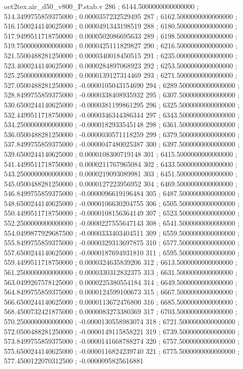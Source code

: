 \begin{filecontents}[overwrite]{oct2tex.air_d50_v800_P.stab.v}
286 ; 6144.5000000000000000 ; 514.3499755859375000 ; 0.0000357232529495
287 ; 6162.5000000000000000 ; 516.1500244140625000 ; 0.0000491343198519
288 ; 6180.5000000000000000 ; 517.9499511718750000 ; 0.0000502086695633
289 ; 6198.5000000000000000 ; 519.7500000000000000 ; 0.0000425111829827
290 ; 6216.5000000000000000 ; 521.5500488281250000 ; 0.0000340018450515
291 ; 6235.0000000000000000 ; 523.4000244140625000 ; 0.0000284897068923
292 ; 6253.5000000000000000 ; 525.2500000000000000 ; 0.0000139127314469
293 ; 6271.5000000000000000 ; 527.0500488281250000 ; -0.0000105043154690
294 ; 6289.5000000000000000 ; 528.8499755859375000 ; -0.0000338408935932
295 ; 6307.5000000000000000 ; 530.6500244140625000 ; -0.0000381199861295
296 ; 6325.5000000000000000 ; 532.4499511718750000 ; -0.0000346344386344
297 ; 6343.5000000000000000 ; 534.2500000000000000 ; -0.0000182933545148
298 ; 6361.5000000000000000 ; 536.0500488281250000 ; -0.0000030571118259
299 ; 6379.5000000000000000 ; 537.8499755859375000 ; -0.0000047480025387
300 ; 6397.5000000000000000 ; 539.6500244140625000 ; 0.0000108300719148
301 ; 6415.5000000000000000 ; 541.4499511718750000 ; 0.0000211767965084
302 ; 6433.5000000000000000 ; 543.2500000000000000 ; 0.0000219093089981
303 ; 6451.5000000000000000 ; 545.0500488281250000 ; 0.0000127223956952
304 ; 6469.5000000000000000 ; 546.8499755859375000 ; -0.0000096619196484
305 ; 6487.5000000000000000 ; 548.6500244140625000 ; -0.0000106630204755
306 ; 6505.5000000000000000 ; 550.4499511718750000 ; -0.0000108156364149
307 ; 6523.5000000000000000 ; 552.2500000000000000 ; -0.0000227555647143
308 ; 6541.5000000000000000 ; 554.0499877929687500 ; -0.0000333403404511
309 ; 6559.5000000000000000 ; 555.8499755859375000 ; -0.0000329313697875
310 ; 6577.5000000000000000 ; 557.6500244140625000 ; -0.0000187694931810
311 ; 6595.5000000000000000 ; 559.4499511718750000 ; 0.0000324635839206
312 ; 6613.5000000000000000 ; 561.2500000000000000 ; 0.0000330312832375
313 ; 6631.5000000000000000 ; 563.0499267578125000 ; 0.0000225380554184
314 ; 6649.5000000000000000 ; 564.8499755859375000 ; 0.0000124599100673
315 ; 6667.5000000000000000 ; 566.6500244140625000 ; 0.0000113672476800
316 ; 6685.5000000000000000 ; 568.4500732421875000 ; 0.0000083273380369
317 ; 6703.5000000000000000 ; 570.2500000000000000 ; -0.0000130558983074
318 ; 6721.5000000000000000 ; 572.0500488281250000 ; -0.0000149115858221
319 ; 6739.5000000000000000 ; 573.8499755859375000 ; -0.0000141668788274
320 ; 6757.5000000000000000 ; 575.6500244140625000 ; -0.0000116824239740
321 ; 6775.5000000000000000 ; 577.4500122070312500 ; -0.0000095825616881

\end{filecontents}

